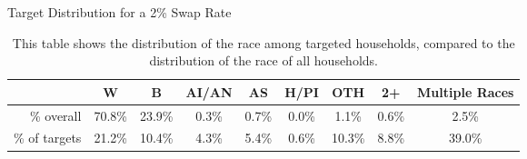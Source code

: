 \begin{table}
    \centering
    Target Distribution for a 2\% Swap Rate
    
    \begin{tabular}{|r|c|c|c|c|c|c|c|c|}
    \hline
                  & W      & B      & AI/AN & AS    & H/PI  & OTH    & 2+    & Multiple Races \\ \hline
    \% overall    & 70.8\% & 23.9\% & 0.3\% & 0.7\% & 0.0\% & 1.1\%  & 0.6\% & 2.5\%          \\ \hline
    \% of targets & 21.2\% & 10.4\% & 4.3\% & 5.4\% & 0.6\% & 10.3\% & 8.8\% & 39.0\%         \\ \hline
    \end{tabular}

    \caption{This table shows the distribution of the race among targeted households, compared to the distribution of the race of all households.}
    \label{tab:target_distribution_2pct}
\end{table}

